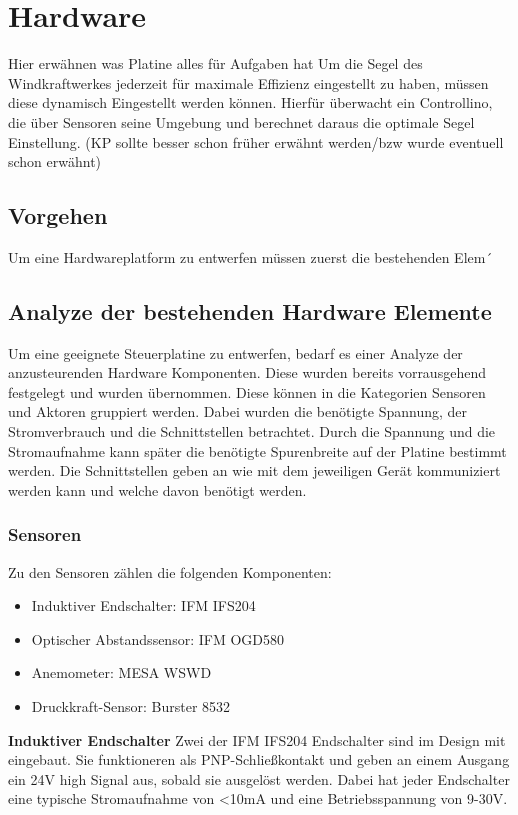 \section{Hardware}
Hier erwähnen was Platine alles für Aufgaben hat
Um die Segel des Windkraftwerkes jederzeit für maximale Effizienz eingestellt zu haben, müssen diese dynamisch Eingestellt werden können. Hierfür überwacht ein Controllino, die über Sensoren seine Umgebung und berechnet daraus die optimale Segel Einstellung. (KP sollte besser schon früher erwähnt werden/bzw wurde eventuell schon erwähnt)
\subsection{Vorgehen}
Um eine Hardwareplatform zu entwerfen müssen zuerst die bestehenden Elem´
\subsection{Analyze der bestehenden Hardware Elemente}
Um eine geeignete Steuerplatine zu entwerfen, bedarf es einer Analyze der anzusteurenden Hardware Komponenten. Diese wurden bereits vorrausgehend festgelegt und wurden übernommen. Diese können in die Kategorien Sensoren und Aktoren gruppiert werden. Dabei wurden die benötigte Spannung, der Stromverbrauch und die Schnittstellen betrachtet. Durch die Spannung und die Stromaufnahme kann später die benötigte Spurenbreite auf der Platine bestimmt werden. Die Schnittstellen geben an wie mit dem jeweiligen Gerät kommuniziert werden kann und welche davon benötigt werden.\\

\subsubsection{Sensoren}
Zu den Sensoren zählen die folgenden Komponenten:
\begin{itemize}
	\item Induktiver Endschalter: IFM IFS204
	\item Optischer Abstandssensor: IFM OGD580
	\item Anemometer: MESA WSWD
	\item Druckkraft-Sensor: Burster 8532
\end{itemize}

\noindent\textbf{Induktiver Endschalter}\newline
Zwei der IFM IFS204 Endschalter sind im Design mit eingebaut. Sie funktioneren als PNP-Schließkontakt und geben an einem Ausgang ein 24V high Signal aus, sobald sie ausgelöst werden. Dabei hat jeder Endschalter eine typische Stromaufnahme von <10mA und eine Betriebsspannung von 9-30V.\\

